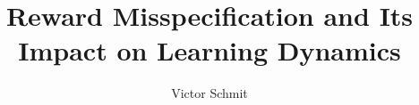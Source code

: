 %
%
%
%
%
%
% 
\documentclass[final]{beamer}

\usepackage[size=a1,orientation=portrait,scale=1.0]{beamerposter}
\usepackage{./template}
\usepackage{graphicx}

\title{Reward Misspecification and Its Impact on Learning Dynamics}
\author{Victor Schmit}



